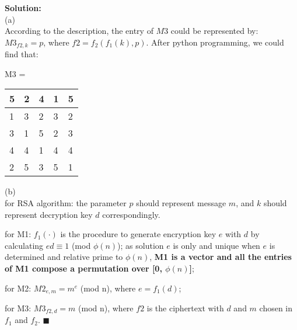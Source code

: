 \documentclass{article}
\newenvironment{solution}                               %
{\textbf{Solution:} \\}{$\blacksquare$\newline}         %
\begin{document}
    \begin{solution}
        (a) \\
        According to the description, the entry of $M3$ could be represented by: $M3_{f2, k} = p$, where $f2 = f_2(f_1(k), p)$. After python programming, we could find that:
        \begin{center}
            M3 = 
            \begin{tabular}{|l|l|l|l|l|}
                \hline 5 & 2 & 4 & 1 & 5 \\
                \hline 1 & 3 & 2 & 3 & 2 \\
                \hline 3 & 1 & 5 & 2 & 3 \\
                \hline 4 & 4 & 1 & 4 & 4 \\
                \hline 2 & 5 & 3 & 5 & 1 \\
                \hline
            \end{tabular}
        \end{center}

        (b) \\
        for RSA algorithm: the parameter $p$ should represent message $m$, and $k$ should represent decryption key $d$ correspondingly.

        for M1: $f_1(\cdot)$ is the procedure to generate encryption key $e$ with $d$ by calculating $ed \equiv 1$ (mod $\phi(n)$); as solution $e$ is only and unique when $e$ is determined and relative prime to $\phi(n)$, \textbf{M1 is a vector and all the entries of M1 compose a permutation over [0, $\phi(n)$]};
        
        for M2: $M2_{e, m} = m^e$ (mod n), where $e = f_1(d)$;

        for M3: $M3_{f2, d} = m$ (mod n), where $f2$ is the ciphertext with $d$ and $m$ chosen in $f_1$ and $f_2$.
    \end{solution}
\end{document}
